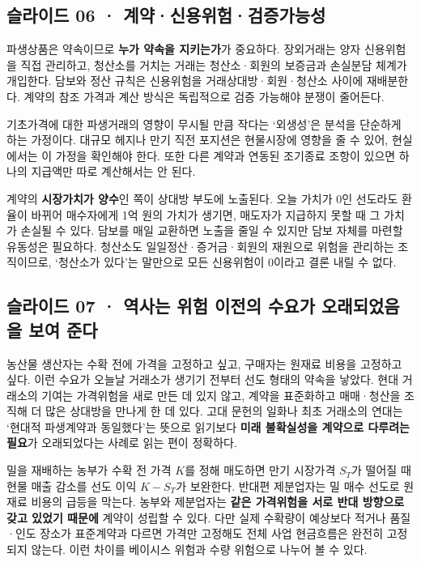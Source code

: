 \documentclass[11pt,a4paper]{article}
\begin{document}
\subsection{슬라이드 06 · 계약·신용위험·검증가능성}
파생상품은 약속이므로 \textbf{누가 약속을 지키는가}가 중요하다. 장외거래는 양자 신용위험을 직접 관리하고, 청산소를 거치는 거래는 청산소·회원의 보증금과 손실분담 체계가 개입한다. 담보와 정산 규칙은 신용위험을 거래상대방·회원·청산소 사이에 재배분한다. 계약의 참조 가격과 계산 방식은 독립적으로 검증 가능해야 분쟁이 줄어든다.\par

기초가격에 대한 파생거래의 영향이 무시될 만큼 작다는 ‘외생성’은 분석을 단순하게 하는 가정이다. 대규모 헤지나 만기 직전 포지션은 현물시장에 영향을 줄 수 있어, 현실에서는 이 가정을 확인해야 한다. 또한 다른 계약과 연동된 조기종료 조항이 있으면 하나의 지급액만 따로 계산해서는 안 된다.\par

계약의 \textbf{시장가치가 양수}인 쪽이 상대방 부도에 노출된다. 오늘 가치가 0인 선도라도 환율이 바뀌어 매수자에게 1억 원의 가치가 생기면, 매도자가 지급하지 못할 때 그 가치가 손실될 수 있다. 담보를 매일 교환하면 노출을 줄일 수 있지만 담보 자체를 마련할 유동성은 필요하다. 청산소도 일일정산·증거금·회원의 재원으로 위험을 관리하는 조직이므로, ‘청산소가 있다’는 말만으로 모든 신용위험이 0이라고 결론 내릴 수 없다.\par

\subsection{슬라이드 07 · 역사는 위험 이전의 수요가 오래되었음을 보여 준다}
농산물 생산자는 수확 전에 가격을 고정하고 싶고, 구매자는 원재료 비용을 고정하고 싶다. 이런 수요가 오늘날 거래소가 생기기 전부터 선도 형태의 약속을 낳았다. 현대 거래소의 기여는 가격위험을 새로 만든 데 있지 않고, 계약을 표준화하고 매매·청산을 조직해 더 많은 상대방을 만나게 한 데 있다. 고대 문헌의 일화나 최초 거래소의 연대는 ‘현대적 파생계약과 동일했다’는 뜻으로 읽기보다 \textbf{미래 불확실성을 계약으로 다루려는 필요}가 오래되었다는 사례로 읽는 편이 정확하다.\par

밀을 재배하는 농부가 수확 전 가격 $K$를 정해 매도하면 만기 시장가격 $S_T$가 떨어질 때 현물 매출 감소를 선도 이익 $K-S_T$가 보완한다. 반대편 제분업자는 밀 매수 선도로 원재료 비용의 급등을 막는다. 농부와 제분업자는 \textbf{같은 가격위험을 서로 반대 방향으로 갖고 있었기 때문에} 계약이 성립할 수 있다. 다만 실제 수확량이 예상보다 적거나 품질·인도 장소가 표준계약과 다르면 가격만 고정해도 전체 사업 현금흐름은 완전히 고정되지 않는다. 이런 차이를 베이시스 위험과 수량 위험으로 나누어 볼 수 있다.\par
\end{document}
